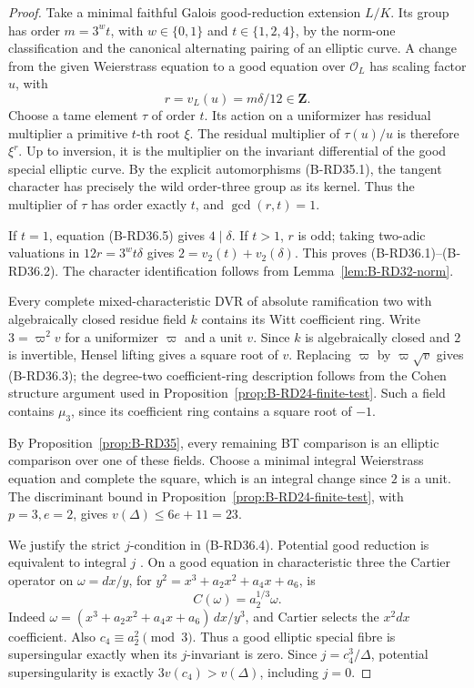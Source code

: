 \begin{proof}
Take a minimal faithful Galois good-reduction extension $L/K$.
Its group has order $m=3^wt$, with $w\in\{0,1\}$ and
$t\in\{1,2,4\}$, by the norm-one classification and the
canonical alternating pairing of an elliptic curve. A change
from the given Weierstrass equation to a good equation over
$\mathcal O_L$ has scaling factor $u$, with
\[
                  r=v_L(u)=m\delta/12\in\mathbf Z.
                                                        \tag{B-RD36.5}
\]
Choose a tame element $\tau$ of order $t$. Its action on a
uniformizer has residual multiplier a primitive $t$-th root
$\xi$. The residual multiplier of $\tau(u)/u$ is therefore
$\xi^r$. Up to inversion, it is the multiplier on the invariant
differential of the good special elliptic curve. By the explicit
automorphisms (B-RD35.1), the tangent character has precisely the
wild order-three group as its kernel. Thus the multiplier of
$\tau$ has order exactly $t$, and $\gcd(r,t)=1$.

If $t=1$, equation (B-RD36.5) gives $4\mid\delta$.
If $t>1$, $r$ is odd; taking two-adic valuations in
$12r=3^wt\delta$ gives
$2=v_2(t)+v_2(\delta)$. This proves (B-RD36.1)--(B-RD36.2).
The character identification follows from
Lemma~\ref{lem:B-RD32-norm}.

Every complete mixed-characteristic DVR of absolute ramification
two with algebraically closed residue field $k$ contains its Witt
coefficient ring. Write $3=\varpi^2v$ for a uniformizer $\varpi$
and a unit $v$. Since $k$ is algebraically closed and $2$ is
invertible, Hensel lifting gives a square root of $v$. Replacing
$\varpi$ by $\varpi\sqrt v$ gives (B-RD36.3); the degree-two
coefficient-ring description follows from the Cohen structure
argument used in Proposition~\ref{prop:B-RD24-finite-test}.
Such a field contains $\mu_3$, since its coefficient ring contains
a square root of $-1$.

By Proposition~\ref{prop:B-RD35}, every remaining BT comparison is
an elliptic comparison over one of these fields. Choose a minimal
integral Weierstrass equation and complete the square, which is an
integral change since $2$ is a unit. The discriminant bound in
Proposition~\ref{prop:B-RD24-finite-test}, with $p=3,e=2$,
gives $v(\Delta)\leq6e+11=23$.

We justify the strict $j$-condition in (B-RD36.4). Potential good
reduction is equivalent to integral $j$
\cite[Section~2, p.~496]{SerreTate1968Good}. On a good equation
in characteristic three the Cartier operator on
$\omega=dx/y$, for $y^2=x^3+a_2x^2+a_4x+a_6$, is
\[
                 C(\omega)=a_2^{1/3}\omega.
\]
Indeed $\omega=(x^3+a_2x^2+a_4x+a_6)\,dx/y^3$, and Cartier
selects the $x^2dx$ coefficient. Also $c_4\equiv a_2^2\pmod3$.
Thus a good elliptic special fibre is supersingular exactly when
its $j$-invariant is zero. Since $j=c_4^3/\Delta$, potential
supersingularity is exactly $3v(c_4)>v(\Delta)$, including $j=0$.


\end{proof}
